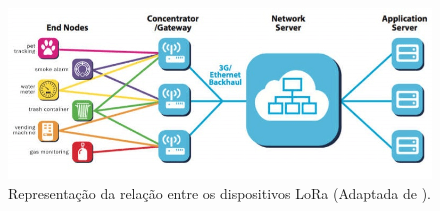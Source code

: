 \begin{figure}[H]
  \centering
  \includegraphics[width=.80\textwidth]{assets/lora-network-architecture.png} 
  \caption{Representação da relação entre os dispositivos LoRa (Adaptada de \cite{lora2021architecture}).}
  \label{fig:end-nodes-gateways} 
\end{figure}




